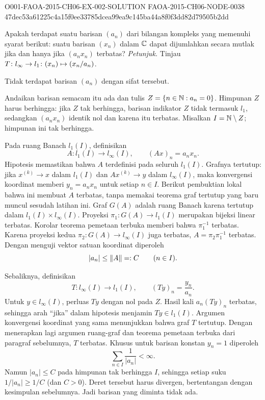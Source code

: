 \begin{o001solution}
  {O001-FAOA-2015-CH06-EX-002-SOLUTION}
  {FAOA-2015-CH06-NODE-0038}
  {47dec53a61225c4a15f0ee33785dcea99ea9c145ba44a8f0f3dd82d79505b2dd}
\begin{o001statement}
Apakah terdapat suatu barisan $(a_n)$ dari bilangan kompleks yang memenuhi
syarat berikut: suatu barisan $(x_n)$ dalam $\mathbb{C}$ dapat dijumlahkan secara mutlak jika dan hanya jika
$(a_nx_n)$ terbatas? \emph{Petunjuk.} Tinjau $ T\colon l_\infty \rightarrow l_1\colon (x_n)
\mapsto (x_n/a_n)$.
\end{o001statement}
\begin{o001answer}
Tidak terdapat barisan $(a_n)$ dengan sifat tersebut.
\end{o001answer}
\begin{o001proof}
Andaikan barisan semacam itu ada dan tulis
$Z=\{n\in\mathbb{N}:a_n=0\}$. Himpunan $Z$ harus berhingga: jika $Z$ tak
berhingga, barisan indikator $Z$ tidak termasuk $l_1$, sedangkan
$(a_nx_n)$ identik nol dan karena itu terbatas. Misalkan
$I=\mathbb{N}\setminus Z$; himpunan ini tak berhingga.

Pada ruang Banach $l_1(I)$, definisikan
\[
 A:l_1(I)\longrightarrow l_\infty(I),\qquad
 (Ax)_n=a_nx_n.
\]
Hipotesis memastikan bahwa $A$ terdefinisi pada seluruh $l_1(I)$. Grafnya
tertutup: jika $x^{(k)}\to x$ dalam $l_1(I)$ dan
$Ax^{(k)}\to y$ dalam $l_\infty(I)$, maka konvergensi koordinat memberi
$y_n=a_nx_n$ untuk setiap $n\in I$. Berikut pembuktian lokal bahwa ini
membuat $A$ terbatas, tanpa memakai teorema graf tertutup yang baru muncul
sesudah latihan ini. Graf $G(A)$ adalah ruang Banach karena tertutup dalam
$l_1(I)\times l_\infty(I)$. Proyeksi
$\pi_1:G(A)\to l_1(I)$ merupakan bijeksi linear terbatas. Korolar teorema
pemetaan terbuka memberi bahwa $\pi_1^{-1}$ terbatas. Karena proyeksi kedua
$\pi_2:G(A)\to l_\infty(I)$ juga terbatas,
$A=\pi_2\pi_1^{-1}$ terbatas. Dengan menguji vektor satuan koordinat
diperoleh
\[
  |a_n|\le \lVert A\rVert=:C\qquad(n\in I).
\]

Sebaliknya, definisikan
\[
 T:l_\infty(I)\longrightarrow l_1(I),\qquad
 (Ty)_n=\frac{y_n}{a_n}.
\]
Untuk $y\in l_\infty(I)$, perluas $Ty$ dengan nol pada $Z$. Hasil kali
$a_n(Ty)_n$ terbatas, sehingga arah ``jika'' dalam hipotesis menjamin
$Ty\in l_1(I)$. Argumen konvergensi koordinat yang sama menunjukkan bahwa
graf $T$ tertutup. Dengan menerapkan lagi argumen ruang-graf dan teorema
pemetaan terbuka dari paragraf sebelumnya, $T$ terbatas. Khusus untuk barisan konstan
$y_n=1$ diperoleh
\[
  \sum_{n\in I}\frac1{|a_n|}<\infty.
\]
Namun $|a_n|\le C$ pada himpunan tak berhingga $I$, sehingga setiap suku
$1/|a_n|\ge1/C$ (dan $C>0$). Deret tersebut harus divergen, bertentangan
dengan kesimpulan sebelumnya. Jadi barisan yang diminta tidak ada.
\end{o001proof}
\end{o001solution}

